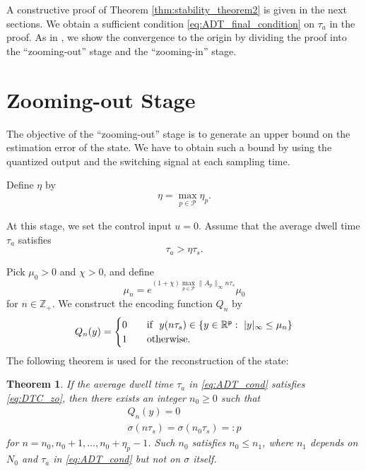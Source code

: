 \documentclass[letterpaper, 11pt, onecolumn]{ieeeconf}  \IEEEoverridecommandlockouts
\newtheorem{theorem}{Theorem}[section]
\begin{document}
A constructive proof of Theorem \ref{thm:stability_theorem2} is given 
in the next sections.
We obtain a sufficient condition \eqref{eq:ADT_final_condition} on $\tau_a$
in the proof.
As in \cite{Liberzon2003, WakaikiMTNS2014, Liberzon2014},
we show the convergence to the origin 
by dividing the proof into the ``zooming-out'' stage and
the ``zooming-in'' stage. 



\section{Zooming-out Stage}


The objective of the ``zooming-out'' stage is to generate 
an upper bound on the estimation error of the state.
We have to obtain such a bound by using the quantized output
and the switching signal at each sampling time.

Define $\eta$ by
\begin{align}
\label{eq:eta_def}
\eta = \max_{p \in \mathcal{P}} \eta_p.
\end{align}



At this stage, we set the control input $u = 0$.
Assume that the average dwell time $\tau_a$ satisfies
\begin{equation}
\label{eq:DTC_zo}
\tau_a > \eta \tau_s.
\end{equation}

Pick $\mu_0 > 0$ and $\chi > 0$, and define
\begin{equation}
\label{eq:j_def_zo}
\mu_{n} = e^{(1+\chi)\max_{p \in \mathcal{P}} \|A_p\|_{\infty} n\tau_s} \mu_0
\end{equation}
for $n\in \mathbb{Z}_+$. We construct the encoding function $Q_{n}$ by 
\begin{equation*}
Q_n(y) =
\begin{cases}
0
&  \quad \text{if~~}y(n \tau_s) \in
\{ y \in \mathbb{R}^{\sf p}:~| y |_{\infty} \leq \mu_n\} \\ 
1
&  \quad \text{otherwise}.
\end{cases}
\end{equation*}
The following theorem is used 
for the reconstruction of the state:
\begin{theorem}
\label{prop:property_of_ADT}
{\em
If the average dwell time $\tau_a$ in \eqref{eq:ADT_cond} 
satisfies \eqref{eq:DTC_zo}, then
there exists an integer $n_0 \geq 0$ such that
\begin{gather}
Q_{n}(y) = 0 \label{eq:zooming_out_QY_SD} \\
\sigma(n\tau_s) = \sigma(n_0\tau_s) =: p \label{eq:zooming_out_SS_SD}
\end{gather}
for $n =n_0,n_0+1,\dots, n_0 + \eta_p - 1$. 
Such $n_0$ satisfies $n_0 \leq n_1$, where
$n_1$ depends on $N_0$ and $\tau_a$ in \eqref{eq:ADT_cond}
but not on $\sigma$ itself.
}
\end{theorem}
\end{document}
